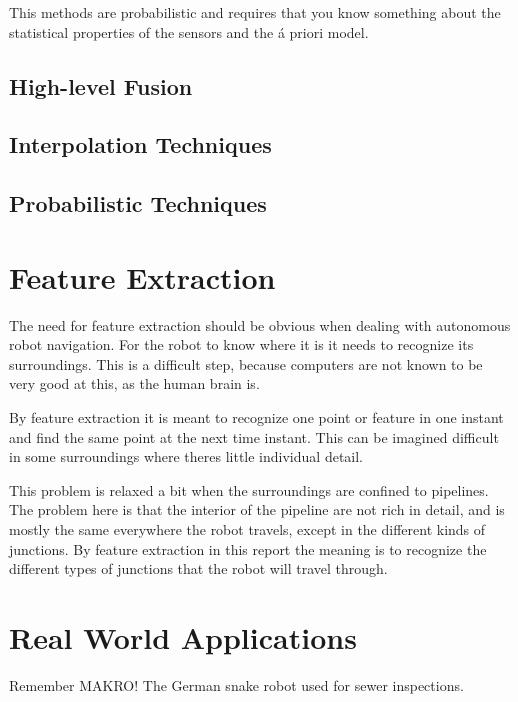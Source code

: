 This methods are probabilistic and requires that you know something about the
statistical properties of the sensors and the \'a priori model. 


\subsection{High-level Fusion}



\subsection{Interpolation Techniques}



\subsection{Probabilistic Techniques}



\section{Feature Extraction}
The need for feature extraction should be obvious when dealing with autonomous robot
navigation. For the robot to know where it is it needs to recognize its surroundings. This
is a difficult step, because computers are not known to be very good at this, as the human
brain is. 

By feature extraction it is meant to recognize one point or feature in one instant and
find the same point at the next time instant. This can be imagined difficult in some
surroundings where theres little individual detail. 

This problem is relaxed a bit when the surroundings are confined to pipelines. The problem
here is that the interior of the pipeline are not rich in detail, and is mostly the same
everywhere the robot travels, except in the different kinds of junctions. By feature
extraction in this report the meaning is to recognize the different types of junctions
that the robot will travel through. 

\cite{theilemann-breivik}




\section{Real World Applications}

Remember MAKRO! The German snake robot used for sewer inspections. 



